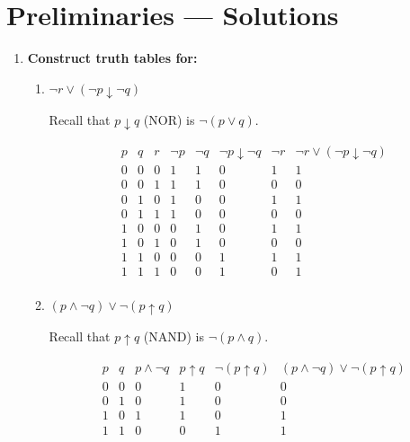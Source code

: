 \chapter{Preliminaries --- Solutions}

\begin{enumerate}[{0.}1. ]

\item \textbf{Construct truth tables for:}

\begin{enumerate}
\item $\neg r \vee (\neg p \downarrow \neg q)$

Recall that $p \downarrow q$ (NOR) is $\neg(p \vee q)$.

\[
\begin{array}{ccc|cc|cc|c}
p & q & r & \neg p & \neg q & \neg p \downarrow \neg q & \neg r & \neg r \vee (\neg p \downarrow \neg q)\\
\hline
0 & 0 & 0 & 1 & 1 & 0 & 1 & 1\\
0 & 0 & 1 & 1 & 1 & 0 & 0 & 0\\
0 & 1 & 0 & 1 & 0 & 0 & 1 & 1\\
0 & 1 & 1 & 1 & 0 & 0 & 0 & 0\\
1 & 0 & 0 & 0 & 1 & 0 & 1 & 1\\
1 & 0 & 1 & 0 & 1 & 0 & 0 & 0\\
1 & 1 & 0 & 0 & 0 & 1 & 1 & 1\\
1 & 1 & 1 & 0 & 0 & 1 & 0 & 1\\
\end{array}
\]

\item $(p \wedge \neg q) \vee \neg(p \uparrow q)$

Recall that $p \uparrow q$ (NAND) is $\neg(p \wedge q)$.

\[
\begin{array}{cc|c|c|c|c}
p & q & p \wedge \neg q & p \uparrow q & \neg(p \uparrow q) & (p \wedge \neg q)\vee\neg(p\uparrow q)\\
\hline
0 & 0 & 0 & 1 & 0 & 0\\
0 & 1 & 0 & 1 & 0 & 0\\
1 & 0 & 1 & 1 & 0 & 1\\
1 & 1 & 0 & 0 & 1 & 1\\
\end{array}
\]
\end{enumerate}


\end{enumerate}
